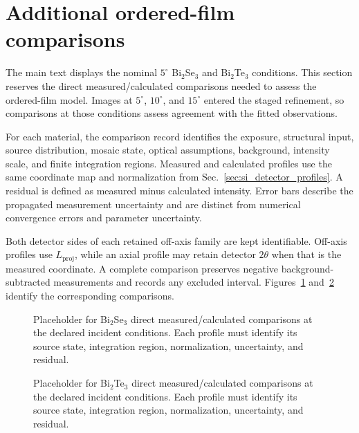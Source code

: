\section{Additional ordered-film comparisons}
\label{sec:si_ordered_comparisons}

The main text displays the nominal $5^\circ$ Bi$_2$Se$_3$ and Bi$_2$Te$_3$ conditions. This section reserves the direct measured/calculated comparisons needed to assess the ordered-film model. Images at $5^\circ$, $10^\circ$, and $15^\circ$ entered the staged refinement, so comparisons at those conditions assess agreement with the fitted observations.

For each material, the comparison record identifies the exposure, structural input, source distribution, mosaic state, optical assumptions, background, intensity scale, and finite integration regions. Measured and calculated profiles use the same coordinate map and normalization from Sec.~\ref{sec:si_detector_profiles}. A residual is defined as measured minus calculated intensity. Error bars describe the propagated measurement uncertainty and are distinct from numerical convergence errors and parameter uncertainty.

Both detector sides of each retained off-axis family are kept identifiable. Off-axis profiles use $L_{\mathrm{proj}}$, while an axial profile may retain detector $2\theta$ when that is the measured coordinate. A complete comparison preserves negative background-subtracted measurements and records any excluded interval. Figures~\ref{fig:si_bi2se3_profiles} and~\ref{fig:si_bi2te3_profiles} identify the corresponding comparisons.

\begin{figure}[!htbp]
  \centering
  \caption{Placeholder for Bi$_2$Se$_3$ direct measured/calculated comparisons at the declared incident conditions. Each profile must identify its source state, integration region, normalization, uncertainty, and residual.}
  \label{fig:si_bi2se3_profiles}
\end{figure}


\begin{figure}[!htbp]
  \centering
  \caption{Placeholder for Bi$_2$Te$_3$ direct measured/calculated comparisons at the declared incident conditions. Each profile must identify its source state, integration region, normalization, uncertainty, and residual.}
  \label{fig:si_bi2te3_profiles}
\end{figure}
